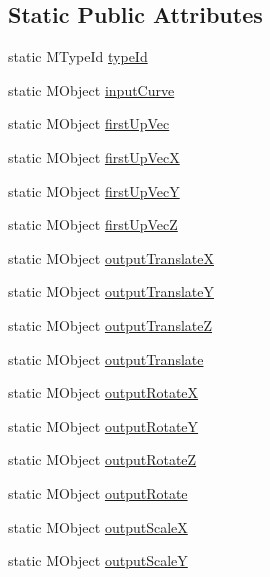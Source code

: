 \subsection*{Static Public Attributes}
\begin{DoxyCompactItemize}
\item 
static M\-Type\-Id \hyperlink{class_m_g__path_spine_a151a6bc4963051bb3ceb6cd45b5e51fc}{type\-Id}
\item 
static M\-Object \hyperlink{class_m_g__path_spine_ab44d5346a186856f9cee0e0b4b50b6b7}{input\-Curve}
\item 
static M\-Object \hyperlink{class_m_g__path_spine_afc674fb8cad25f40d47c292696b1737d}{first\-Up\-Vec}
\item 
static M\-Object \hyperlink{class_m_g__path_spine_aba3135fe0e05c181f1123510fec9118d}{first\-Up\-Vec\-X}
\item 
static M\-Object \hyperlink{class_m_g__path_spine_a681e0163d082d9e5b9ba0362b45ac58c}{first\-Up\-Vec\-Y}
\item 
static M\-Object \hyperlink{class_m_g__path_spine_aae8d7d46c33e1da9fae50fc557fa7b71}{first\-Up\-Vec\-Z}
\item 
static M\-Object \hyperlink{class_m_g__path_spine_a8b4339da0fdb021a6b91d1449c99732a}{output\-Translate\-X}
\item 
static M\-Object \hyperlink{class_m_g__path_spine_ab4aca6c192a9818ab64096edf8aaea0d}{output\-Translate\-Y}
\item 
static M\-Object \hyperlink{class_m_g__path_spine_ac19e9b5e38b171a158692ce31204dc1b}{output\-Translate\-Z}
\item 
static M\-Object \hyperlink{class_m_g__path_spine_a459813326a0970b67a4d94798a47aaba}{output\-Translate}
\item 
static M\-Object \hyperlink{class_m_g__path_spine_a5d73906fe1c6ec0b372c0ef3da2a0026}{output\-Rotate\-X}
\item 
static M\-Object \hyperlink{class_m_g__path_spine_a11b0bb32a6931055ec6d06b595f11b7e}{output\-Rotate\-Y}
\item 
static M\-Object \hyperlink{class_m_g__path_spine_a7449fba41f2530d7fa797d392beeb0e0}{output\-Rotate\-Z}
\item 
static M\-Object \hyperlink{class_m_g__path_spine_aa9044a045524a44c3d322c979cc9b8e8}{output\-Rotate}
\item 
static M\-Object \hyperlink{class_m_g__path_spine_a34a92ba0bc42a34ff70602b136272a01}{output\-Scale\-X}
\item 
static M\-Object \hyperlink{class_m_g__path_spine_a5cbcb31bcb281e841905b6ec643ce5bc}{output\-Scale\-Y}

\end{DoxyCompactItemize}
